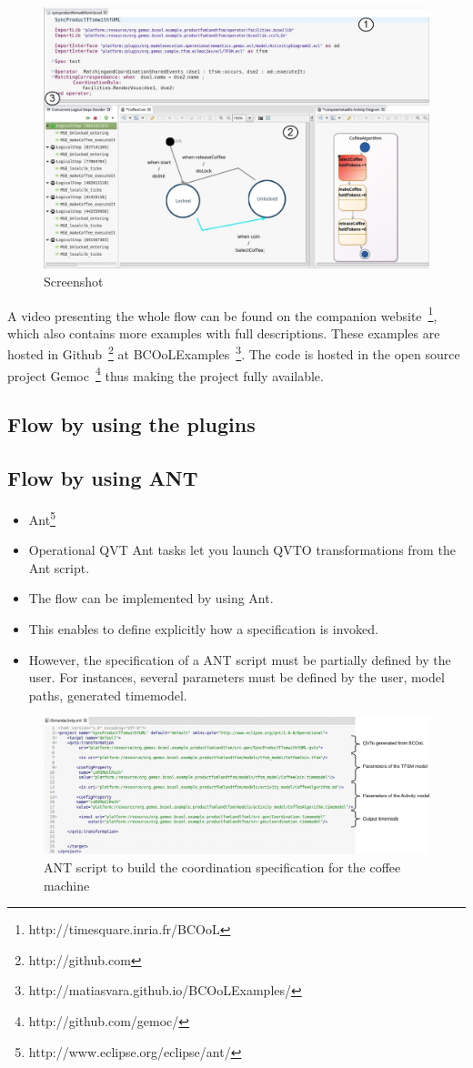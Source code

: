 \begin{figure}[h]
	\begin{center}
		\includegraphics[width=.6\textwidth]{bcool/figs/bcoolscreen.png}
		\caption{Screenshot}
		\label{fig:screenbcool}
	\end{center}
\end{figure}

A video presenting the whole flow can be found on the companion website~\footnote{http://timesquare.inria.fr/BCOoL}, which also contains more examples with full descriptions. These examples are hosted in Github~\footnote{http://github.com} at BCOoLExamples~\footnote{http://matiasvara.github.io/BCOoLExamples/}. The \bcool code is hosted in the open source project Gemoc~\footnote{http://github.com/gemoc/} thus making the project fully available.

\subsection{Flow by using the plugins}
\subsection{Flow by using ANT}
	\begin{itemize}
		\item Ant\footnote{http://www.eclipse.org/eclipse/ant/}
		\item Operational QVT Ant tasks let you launch QVTO transformations from the Ant script.
		\item The flow can be implemented by using Ant.
		\item This enables to define explicitly how a \bcool specification is invoked. 
		\item However, the specification of a ANT script must be partially defined by the user. For instances, several parameters must be defined by the user, \eg model paths, generated timemodel. 
		  
	\end{itemize}


  \begin{figure}[h]
  	\begin{center}
  		\includegraphics[width=1\textwidth]{bcool/figs/antbcool.pdf}
  		\caption{ANT script to build the coordination specification for the coffee machine}
  		\label{fig:screenantbcool}
  	\end{center}
  \end{figure}

